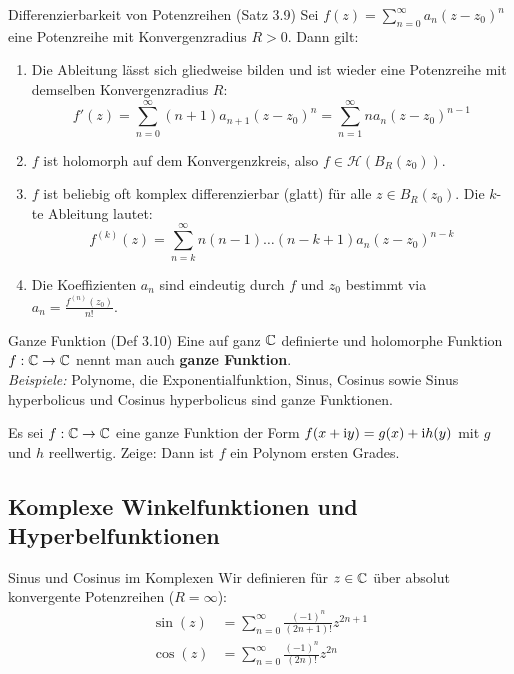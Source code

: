 \begin{satz}{Differenzierbarkeit von Potenzreihen (Satz 3.9)}
Sei $f(z) = \sum_{n=0}^\infty a_n(z-z_0)^n$ eine Potenzreihe mit Konvergenzradius $R > 0$. Dann gilt:
\begin{enumerate}
    \item[i)] Die Ableitung lässt sich gliedweise bilden und ist wieder eine Potenzreihe mit demselben Konvergenzradius $R$:
    \[ f'(z) = \sum_{n=0}^\infty (n+1)a_{n+1}(z-z_0)^n = \sum_{n=1}^\infty n a_n (z-z_0)^{n-1} \]
    \item[ii)] $f$ ist holomorph auf dem Konvergenzkreis, also $f \in \mathcal{H}(B_R(z_0))$.
    \item[iii)] $f$ ist beliebig oft komplex differenzierbar (glatt) für alle $z \in B_R(z_0)$. Die $k$-te Ableitung lautet:
    \[ f^{(k)}(z) = \sum_{n=k}^\infty n(n-1)\dots(n-k+1) a_n (z-z_0)^{n-k} \]
    \item[iv)] Die Koeffizienten $a_n$ sind eindeutig durch $f$ und $z_0$ bestimmt via $a_n = \frac{f^{(n)}(z_0)}{n!}$.
\end{enumerate}
\end{satz}

\begin{defi}{Ganze Funktion (Def 3.10)}
Eine auf ganz $\mathbb{C}$ definierte und holomorphe Funktion $f: \mathbb{C} \to \mathbb{C}$ nennt man auch \textbf{ganze Funktion}. \\
\textit{Beispiele:} Polynome, die Exponentialfunktion, Sinus, Cosinus sowie Sinus hyperbolicus und Cosinus hyperbolicus sind ganze Funktionen.
\end{defi}

\vspace{0.3cm}
\begin{tcolorbox}[colback=yellow!5!white, colframe=orange!75!black, fonttitle=\bfseries, title={Übungsblatt 2, Aufgabe 2}]
Es sei $f: \mathbb{C} \to \mathbb{C}$ eine ganze Funktion der Form $f(x+\mathrm{i} y) = g(x) + \mathrm{i} h(y)$ mit $g$ und $h$ reellwertig. Zeige: Dann ist $f$ ein Polynom ersten Grades.
\end{tcolorbox}
\vspace{0.3cm}

\subsection{Komplexe Winkelfunktionen und Hyperbelfunktionen}

\begin{defi}{Sinus und Cosinus im Komplexen}
Wir definieren für $z \in \mathbb{C}$ über absolut konvergente Potenzreihen ($R=\infty$):
\begin{align*}
    \sin(z) &= \sum_{n=0}^\infty \frac{(-1)^n}{(2n+1)!} z^{2n+1} \\
    \cos(z) &= \sum_{n=0}^\infty \frac{(-1)^n}{(2n)!} z^{2n}
\end{align*}
\end{defi}

